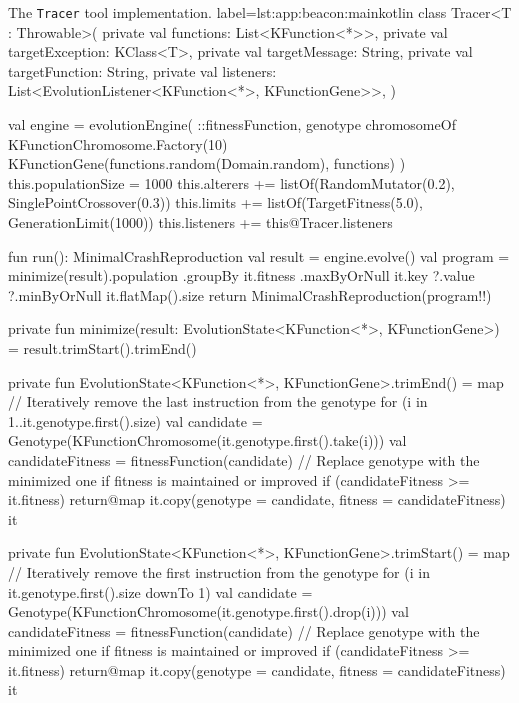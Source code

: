 \begin{code}{%
    The \texttt{Tracer} tool implementation.
}{label=lst:app:beacon:main}{kotlin}
    class Tracer<T : Throwable>(
        private val functions: List<KFunction<*>>,
        private val targetException: KClass<T>,
        private val targetMessage: String,
        private val targetFunction: String,
        private val listeners: List<EvolutionListener<KFunction<*>, KFunctionGene>>,
    ) {
        val engine = evolutionEngine(
            ::fitnessFunction,
            genotype {
                chromosomeOf {
                    KFunctionChromosome.Factory(10) {
                        KFunctionGene(functions.random(Domain.random), functions)
                    }
                }
            }
        ) {
            this.populationSize = 1000
            this.alterers += listOf(RandomMutator(0.2), SinglePointCrossover(0.3))
            this.limits += listOf(TargetFitness(5.0), GenerationLimit(1000))
            this.listeners += this@Tracer.listeners
        }

        fun run(): MinimalCrashReproduction {
            val result = engine.evolve()
            val program = minimize(result).population
                .groupBy { it.fitness }
                .maxByOrNull { it.key }?.value
                ?.minByOrNull { it.flatMap().size }
            return MinimalCrashReproduction(program!!)
        }

        private fun minimize(result: EvolutionState<KFunction<*>, KFunctionGene>) = 
            result.trimStart().trimEnd()

        private fun EvolutionState<KFunction<*>, KFunctionGene>.trimEnd() = map {
            // Iteratively remove the last instruction from the genotype
            for (i in 1..it.genotype.first().size) {
                val candidate = Genotype(KFunctionChromosome(it.genotype.first().take(i)))
                val candidateFitness = fitnessFunction(candidate)
                // Replace genotype with the minimized one if fitness is maintained or improved
                if (candidateFitness >= it.fitness) {
                    return@map it.copy(genotype = candidate, fitness = candidateFitness)
                }
            }
            it
        }


        private fun EvolutionState<KFunction<*>, KFunctionGene>.trimStart() = map {
            // Iteratively remove the first instruction from the genotype
            for (i in it.genotype.first().size downTo 1) {
                val candidate = Genotype(KFunctionChromosome(it.genotype.first().drop(i)))
                val candidateFitness = fitnessFunction(candidate)
                // Replace genotype with the minimized one if fitness is maintained or improved
                if (candidateFitness >= it.fitness) {
                    return@map it.copy(genotype = candidate, fitness = candidateFitness)
                }
            }
            it
        }

}
\end{code}
